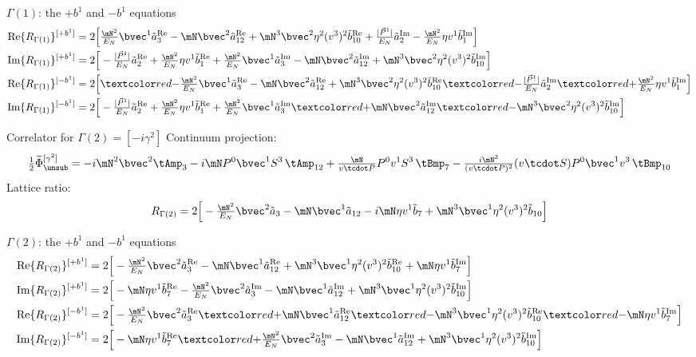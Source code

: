 \begin{frame}{$\Gamma(1)$: the $+b^1$ and $-b^1$ equations}
  \small
  \begin{align*}
    \Rr{Re}{1}{+b^1}&=2\Big[\tfrac{\mN^2}{\En}\bvec^1\aR3-\mN\bvec^2\aR{12}+\mN^3\bvec^2\eta^2(v^3)^2\bR{10}+\tfrac{\Pa}{\En}\aI2-\tfrac{\mN^2}{\En}\eta v^1\bI1\Big]\\
    \Rr{Im}{1}{+b^1}&=2\Big[-\tfrac{\Pa}{\En}\aR2+\tfrac{\mN^2}{\En}\eta v^1\bR1+\tfrac{\mN^2}{\En}\bvec^1\aI3-\mN\bvec^2\aI{12}+\mN^3\bvec^2\eta^2(v^3)^2\bI{10}\Big]\\
    \Rr{Re}{1}{-b^1}&=2\Big[\fl{-}\tfrac{\mN^2}{\En}\bvec^1\aR3-\mN\bvec^2\aR{12}+\mN^3\bvec^2\eta^2(v^3)^2\bR{10}\fl{-}\tfrac{\Pa}{\En}\aI2\fl{+}\tfrac{\mN^2}{\En}\eta v^1\bI1\Big]\\
    \Rr{Im}{1}{-b^1}&=2\Big[-\tfrac{\Pa}{\En}\aR2+\tfrac{\mN^2}{\En}\eta v^1\bR1+\tfrac{\mN^2}{\En}\bvec^1\aI3\fl{+}\mN\bvec^2\aI{12}\fl{-}\mN^3\bvec^2\eta^2(v^3)^2\bI{10}\Big]
  \end{align*}
\end{frame}

\begin{frame}{Correlator for $\Gamma(2)=[-i\gamma^2]$}
  \small
  Continuum projection:
  \[ \tfrac12\widetilde\Phi^{[\gamma^2]}_{\unsub}=-i\mN^2\bvec^2\tAmp_3-i\mN P^0\bvec^1S^3\,\tAmp_{12}+\tfrac{\mN}{v\tcdot P}P^0v^1S^3\,\tBmp_7-\tfrac{i\mN^3}{(v\tcdot P)^2}(v\tcdot S)P^0\bvec^1v^3\,\tBmp_{10} \]
  Lattice ratio:
  \[ R_{\Gamma(2)}=2\Big[-\tfrac{\mN^2}{\En}\bvec^2\tilde a_3-\mN\bvec^1\tilde a_{12}-i\mN\eta v^1\tilde b_7+\mN^3\bvec^1\eta^2(v^3)^2\tilde b_{10}\Big] \]
\end{frame}

\begin{frame}{$\Gamma(2)$: the $+b^1$ and $-b^1$ equations}
  \small
  \begin{align*}
    \Rr{Re}{2}{+b^1}&=2\Big[-\tfrac{\mN^2}{\En}\bvec^2\aR3-\mN\bvec^1\aR{12}+\mN^3\bvec^1\eta^2(v^3)^2\bR{10}+\mN\eta v^1\bI7\Big]\\
    \Rr{Im}{2}{+b^1}&=2\Big[-\mN\eta v^1\bR7-\tfrac{\mN^2}{\En}\bvec^2\aI3-\mN\bvec^1\aI{12}+\mN^3\bvec^1\eta^2(v^3)^2\bI{10}\Big]\\
    \Rr{Re}{2}{-b^1}&=2\Big[-\tfrac{\mN^2}{\En}\bvec^2\aR3\fl{+}\mN\bvec^1\aR{12}\fl{-}\mN^3\bvec^1\eta^2(v^3)^2\bR{10}\fl{-}\mN\eta v^1\bI7\Big]\\
    \Rr{Im}{2}{-b^1}&=2\Big[-\mN\eta v^1\bR7\fl{+}\tfrac{\mN^2}{\En}\bvec^2\aI3-\mN\bvec^1\aI{12}+\mN^3\bvec^1\eta^2(v^3)^2\bI{10}\Big]
  \end{align*}
\end{frame}

